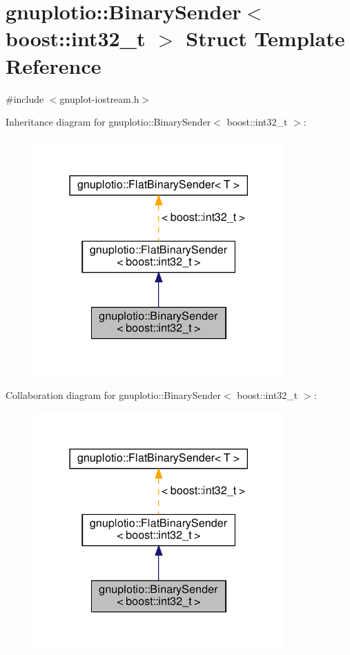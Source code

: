 \hypertarget{structgnuplotio_1_1_binary_sender_3_01boost_1_1int32__t_01_4}{}\section{gnuplotio\+:\+:Binary\+Sender$<$ boost\+:\+:int32\+\_\+t $>$ Struct Template Reference}
\label{structgnuplotio_1_1_binary_sender_3_01boost_1_1int32__t_01_4}


{\ttfamily \#include $<$gnuplot-\/iostream.\+h$>$}



Inheritance diagram for gnuplotio\+:\+:Binary\+Sender$<$ boost\+:\+:int32\+\_\+t $>$\+:
\nopagebreak
\begin{figure}[H]
\begin{center}
\leavevmode
\includegraphics[width=273pt]{structgnuplotio_1_1_binary_sender_3_01boost_1_1int32__t_01_4__inherit__graph}
\end{center}
\end{figure}


Collaboration diagram for gnuplotio\+:\+:Binary\+Sender$<$ boost\+:\+:int32\+\_\+t $>$\+:
\nopagebreak
\begin{figure}[H]
\begin{center}
\leavevmode
\includegraphics[width=273pt]{structgnuplotio_1_1_binary_sender_3_01boost_1_1int32__t_01_4__coll__graph}
\end{center}
\end{figure}

